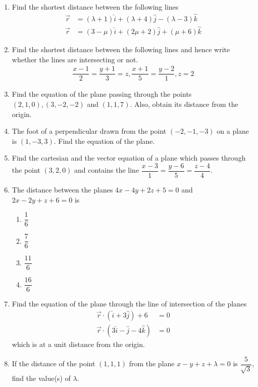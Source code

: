 \begin{enumerate}[label=\thesection.\arabic*.,ref=\thesection.\theenumi]
	\item Find the shortest distance between the following lines
		\begin{align}
			\vec{r}&=(\lambda+1)\hat{i}+(\lambda+4)\hat{j}-(\lambda-3)\hat{k}\\\vec{r}&=(3-\mu)\hat{i}+(2\mu+2)\hat{j}+(\mu+6)\hat{k}
		\end{align}
	
	\item Find the shortest distance between the following lines and hence write whether the lines are intersecting or not.
		\begin{align}
			\dfrac{x-1}{2}=\dfrac{y+1}{3}=z, \dfrac{x+1}{5}=\dfrac{y-2}{1}, z=2
		\end{align}

		\item Find the equation of the plane passing through the points $(2,1,0),(3,-2,-2)$ and $(1,1,7)$. Also, obtain its distance from the origin.

	\item The foot of a perpendicular drawn from the point $(-2,-1,-3)$ on a plane is $(1,-3,3)$. Find the equation of the plane.

	\item Find the cartesian and the vector equation of a plane which passes through the point $(3,2,0)$ and contains the line $\dfrac{x-3}{1}=\dfrac{y-6}{5}=\dfrac{z-4}{4}$.

	\item The distance between the planes $4x-4y+2z+5=0$ and $2x-2y+z+6=0$ is

		\begin{enumerate}

			\item $\dfrac{1}{6}$
			\item $\dfrac{7}{6}$
			\item $\dfrac{11}{6}$
			\item $\dfrac{16}{6}$
		\end{enumerate}

	\item Find the equation of the plane through the line of intersection of the planes
		\begin{align}
			\vec{r}\cdot(\hat{i}+3\hat{j})+6&=0\\\vec{r}\cdot(3\hat{i}-\hat{j}-4\hat{k})&=0
		\end{align}which is at a  unit distance from the origin.

		\item If the distance of the point $(1,1,1)$ from the plane $x-y+z+\lambda=0$ is $\dfrac{5}{\sqrt{3}}$, find the value(s) of $\lambda$.


\end{enumerate}
